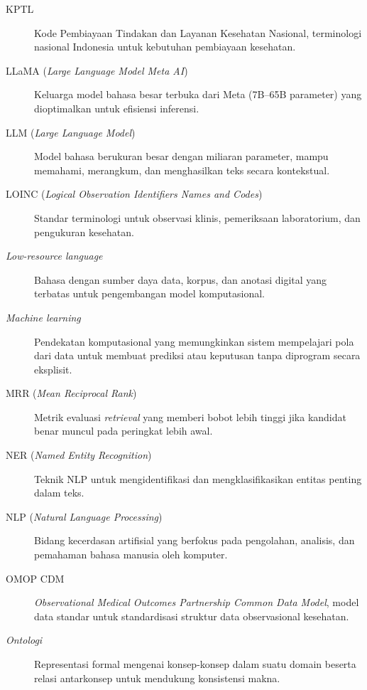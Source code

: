{\begin{description}
    \item[KPTL] Kode Pembiayaan Tindakan dan Layanan Kesehatan Nasional, terminologi nasional Indonesia untuk kebutuhan pembiayaan kesehatan.

    \item[LLaMA (\textit{Large Language Model Meta AI})] Keluarga model bahasa besar terbuka dari Meta (7B--65B parameter) yang dioptimalkan untuk efisiensi inferensi.

    \item[LLM (\textit{Large Language Model})] Model bahasa berukuran besar dengan miliaran parameter, mampu memahami, merangkum, dan menghasilkan teks secara kontekstual.

    \item[LOINC (\textit{Logical Observation Identifiers Names and Codes})] Standar terminologi untuk observasi klinis, pemeriksaan laboratorium, dan pengukuran kesehatan.

    \item[\textit{Low-resource language}] Bahasa dengan sumber daya data, korpus, dan anotasi digital yang terbatas untuk pengembangan model komputasional.

    \item[\textit{Machine learning}] Pendekatan komputasional yang memungkinkan sistem mempelajari pola dari data untuk membuat prediksi atau keputusan tanpa diprogram secara eksplisit.

    \item[MRR (\textit{Mean Reciprocal Rank})] Metrik evaluasi \textit{retrieval} yang memberi bobot lebih tinggi jika kandidat benar muncul pada peringkat lebih awal.

    \item[NER (\textit{Named Entity Recognition})] Teknik NLP untuk mengidentifikasi dan mengklasifikasikan entitas penting dalam teks.

    \item[NLP (\textit{Natural Language Processing})] Bidang kecerdasan artifisial yang berfokus pada pengolahan, analisis, dan pemahaman bahasa manusia oleh komputer.

    \item[OMOP CDM] \textit{Observational Medical Outcomes Partnership Common Data Model}, model data standar untuk standardisasi struktur data observasional kesehatan.

    \item[\textit{Ontologi}] Representasi formal mengenai konsep-konsep dalam suatu domain beserta relasi antarkonsep untuk mendukung konsistensi makna.


\end{description}}
